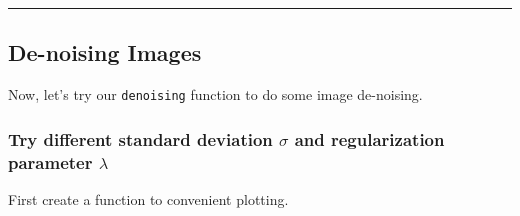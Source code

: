 \documentclass[11pt]{article}
\begin{document}
    \begin{center}\rule{0.5\linewidth}{\linethickness}\end{center}

\subsection{De-noising Images}\label{de-noising-images}

Now, let's try our \texttt{denoising} function to do some image
de-noising.

\subsubsection{\texorpdfstring{Try different standard deviation
\(\sigma\) and regularization parameter
\(\lambda\)}{Try different standard deviation \textbackslash{}sigma and regularization parameter \textbackslash{}lambda}}\label{try-different-standard-deviation-sigma-and-regularization-parameter-lambda}

First create a function to convenient plotting.
\end{document}
